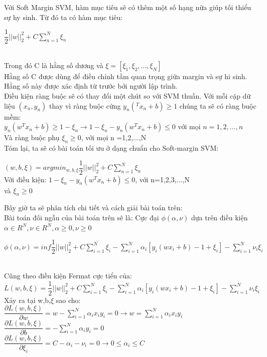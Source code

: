 \documentclass[12pt,a4paper]{article}
\begin{document}
\indent Với Soft Margin SVM, hàm mục tiêu sẽ có thêm một số hạng nữa giúp tối thiểu sự hy sinh. Từ đó ta có hàm mục tiêu:\\
\centerline{$\dfrac{1}{2}||w||_2^2 + C\sum_{n=1}^N\xi_n$}\\
Trong đó C là hằng số dương và $\xi = [\xi_1,\xi_2,...,\xi_N]$\\
\indent Hằng số C được dùng để điều chỉnh tầm quan trọng giữa margin và sự hi sinh. Hằng số này được xác định từ trước bởi người lập trình.\\
Điều kiện ràng buộc sẽ có thay đổi một chút so với SVM thuần. Với mỗi cặp dữ liệu $(x_n,y_n)$ thay vì ràng buộc cứng $y_n(^Tx_n+b) \geq 1$ chúng ta sẽ có ràng buộc mềm: \\
$y_n(w^Tx_n+b) \geq 1 - \xi_n \rightarrow 1-\xi_n - y_n(w^Tx_n +b) \leq 0$ với mọi $n=1,2,...,n$ \\
Và ràng buộc phụ $\xi_n \geq 0$, với mọi n =1,2,...,N \\ 
\indent Tóm lại, ta sẽ có bài toán tối ưu ở dạng chuẩn cho Soft-margin SVM:
\begin{center}
    $(w,b,\xi) = argmin_{w,b,\xi}\dfrac{1}{2}||w||_2^2 + C\sum_{n=1}^N\xi_n$\\
    Với điều kiện: $1-\xi_n - y_n(w^Tx_n+b) \leq 0$, với n=1,2,3,...,N \\
    và $\xi_n \geq 0$
\end{center}
Bây giờ ta sẽ phân tích chi tiết và cách giải bài toán trên: \\
Bài toán đối ngẫu của bài toán trên sẽ là:
Cực đại $\phi(\alpha,\nu)$ dựa trên điều kiện $\alpha \in R^N, \nu\in R^N, \alpha \geq 0, \nu \geq 0$\\
\centerline{$\phi(\alpha, \nu) = inf{\dfrac{1}{2}||w||_2^2+C\sum_{i=1}^N\xi_i - \sum_{i=1}^N\alpha_i[y_i(wx_i+b)-1+\xi_i] - \sum_{i=1}^N \nu_i\xi_i}$}\\
Cũng theo điều kiện Fermat cực tiểu của: \\
\indent $L(w,b,\xi) = \dfrac{1}{2}||w||_2^2+C\sum_{i=1}^N\xi_i - \sum_{i=1}^N\alpha_i[y_i(wx_i+b)-1+\xi_i] - \sum_{i=1}^N \nu_i\xi_i$\\
Xảy ra tại w,b,$\xi$ sao cho: \\ 
\indent  $\dfrac{\partial L(w,b,\xi)}{\partial w} = w - \sum_{i=1}^N \alpha_ix_iy_i = 0 \rightarrow w = \sum_{i=1}^N\alpha_ix_iy_i$\\
\indent  $\dfrac{\partial L(w,b,\xi)}{\partial b} = -\sum_{i=1}^N \alpha_iy_i=0$\\
\indent $\dfrac{\partial L(w,b,\xi)}{\partial \xi_i} = C- \alpha_i - \nu_i =0 \rightarrow 0 \leq \alpha_i \leq C$\\
\end{document}
